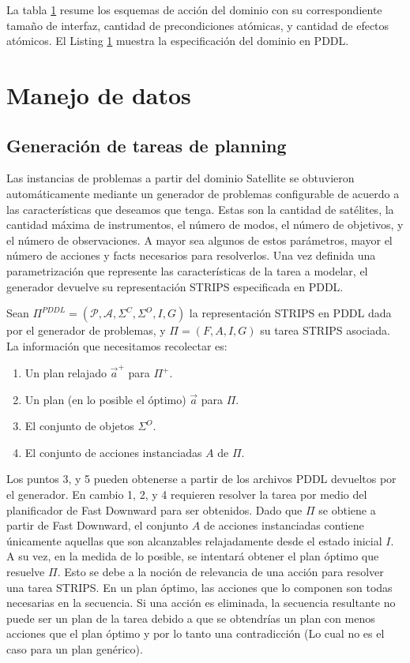 La tabla \ref{} resume los esquemas de acción del dominio con su correspondiente tamaño de interfaz, cantidad de precondiciones atómicas, y cantidad de efectos atómicos. El Listing \ref{} muestra la especificación del dominio en PDDL.

\section{Manejo de datos}

\subsection{Generación de tareas de planning}
\label{method:data_generation}

Las instancias de problemas a partir del dominio Satellite se obtuvieron automáticamente mediante un generador de problemas configurable de acuerdo a las características que deseamos que tenga. Estas son la cantidad de satélites, la cantidad máxima de instrumentos, el número de modos, el número de objetivos, y el número de observaciones. A mayor sea algunos de estos parámetros, mayor el número de acciones y facts necesarios para resolverlos. Una vez definida una parametrización que represente las características de la tarea a modelar, el generador devuelve su representación STRIPS especificada en PDDL.


Sean $\Pi^{PDDL} = (\mathcal{P}, \mathcal{A}, \Sigma^{C}, \Sigma^{O}, I, G)$ la representación STRIPS en PDDL dada por el generador de problemas, y $\Pi = (F, A, I, G)$ su tarea STRIPS asociada. La información que necesitamos recolectar es:

\begin{enumerate}
    \item Un plan relajado $\vec{a}^{+}$ para $\Pi^{+}$.
    \item Un plan (en lo posible el óptimo) $\vec{a}$ para $\Pi$.
    \item El conjunto de objetos $\Sigma^{O}$.
    \item El conjunto de acciones instanciadas $A$ de $\Pi$.
\end{enumerate}

Los puntos 3, y 5 pueden obtenerse a partir de los archivos PDDL devueltos por el generador. En cambio 1, 2, y 4 requieren resolver la tarea por medio del planificador de Fast Downward para ser obtenidos. Dado que $\Pi$ se obtiene a partir de Fast Downward, el conjunto $A$ de acciones instanciadas contiene únicamente aquellas que son alcanzables relajadamente desde el estado inicial $I$. A su vez, en la medida de lo posible, se intentará obtener el plan óptimo que resuelve $\Pi$. Esto se debe a la noción de relevancia de una acción para resolver una tarea STRIPS. En un plan óptimo, las acciones que lo componen son todas necesarias en la secuencia. Si una acción es eliminada, la secuencia resultante no puede ser un plan de la tarea debido a que se obtendrías un plan con menos acciones que el plan óptimo y por lo tanto una contradicción (Lo cual no es el caso para un plan genérico).

